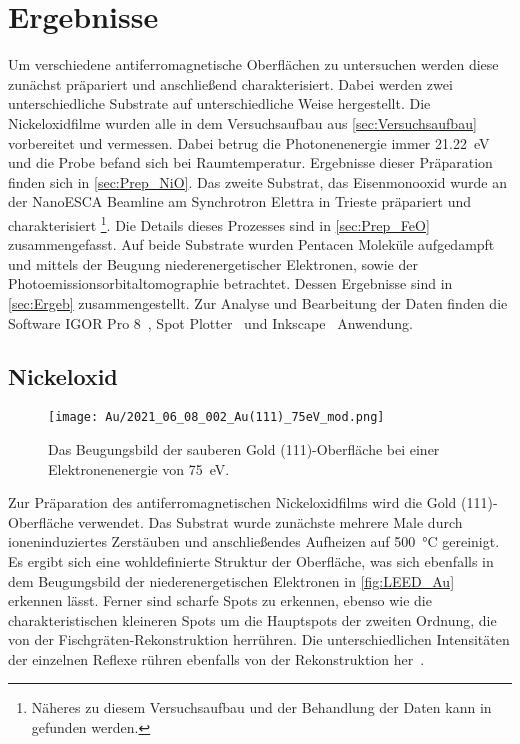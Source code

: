 \chapter{Ergebnisse}
    Um verschiedene antiferromagnetische Oberflächen zu untersuchen werden diese zunächst präpariert und anschließend charakterisiert.
    Dabei werden zwei unterschiedliche Substrate auf unterschiedliche Weise hergestellt.
    Die Nickeloxidfilme wurden alle in dem Versuchsaufbau aus \autoref{sec:Versuchsaufbau} vorbereitet und vermessen.
    Dabei betrug die Photonenenergie immer \SI{21.22}{\electronvolt} und die Probe befand sich bei Raumtemperatur.
    Ergebnisse dieser Präparation finden sich in \autoref{sec:Prep_NiO}.
    Das zweite Substrat, das Eisenmonooxid wurde an der NanoESCA Beamline am Synchrotron Elettra in Trieste präpariert und charakterisiert \footnote{Näheres zu diesem Versuchsaufbau und der Behandlung der Daten kann in~\cite{ma-DJ} gefunden werden.}.
    Die Details dieses Prozesses sind in \autoref{sec:Prep_FeO} zusammengefasst.
    Auf beide Substrate wurden Pentacen Moleküle aufgedampft und mittels der Beugung niederenergetischer Elektronen, sowie der Photoemissionsorbitaltomographie betrachtet.
    Dessen Ergebnisse sind in \autoref{sec:Ergeb} zusammengestellt.
    Zur Analyse und Bearbeitung der Daten finden die Software IGOR Pro 8~\cite{IGOR}, Spot Plotter~\cite{SpotPlotter} und Inkscape~\cite{Inkscape} Anwendung.

    \section{Nickeloxid} \label{sec:Prep_NiO}
        \begin{figure}
            \centering
            \texttt{[image: Au/2021\_06\_08\_002\_Au(111)\_75eV\_mod.png]}            
            \caption{Das Beugungsbild der sauberen Gold (111)-Oberfläche bei einer Elektronenenergie von \SI{75}{\electronvolt}.}
            \label{fig:LEED_Au}
        \end{figure}
        Zur Präparation des antiferromagnetischen Nickeloxidfilms wird die Gold (111)-Oberfläche verwendet.
        Das Substrat wurde zunächste mehrere Male durch ioneninduziertes Zerstäuben und anschließendes Aufheizen auf \SI{500}{\celsius} gereinigt.
        Es ergibt sich eine wohldefinierte Struktur der Oberfläche, was sich ebenfalls in dem Beugungsbild der niederenergetischen Elektronen in \autoref{fig:LEED_Au} erkennen lässt.
        Ferner sind scharfe Spots zu erkennen, ebenso wie die charakteristischen kleineren Spots um die Hauptspots der zweiten Ordnung, die von der Fischgräten-Rekonstruktion herrühren.
        Die unterschiedlichen Intensitäten der einzelnen Reflexe rühren ebenfalls von der Rekonstruktion her~\cite{haag_epitaxial_2016}.

